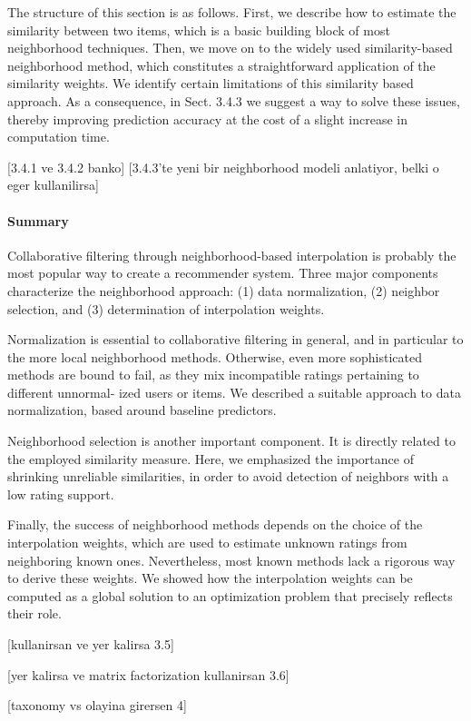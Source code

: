 The structure of this section is as follows. First, we describe how to estimate the similarity between two items, which is a basic building block of most neighborhood techniques. Then, we move on to the widely used similarity-based neighborhood method, which constitutes a straightforward application of the similarity weights. We identify certain limitations of this similarity based approach. As a consequence, in Sect. 3.4.3 we suggest a way to solve these issues, thereby improving prediction accuracy at the cost of a slight increase in computation time.

[3.4.1 ve 3.4.2 banko]
[3.4.3'te yeni bir neighborhood modeli anlatiyor, belki o eger kullanilirsa]

\paragraph{Summary}


Collaborative filtering through neighborhood-based interpolation is probably the most popular way to create a recommender system. Three major components characterize the neighborhood approach: (1) data normalization, (2) neighbor selection, and (3) determination of interpolation weights.

Normalization is essential to collaborative filtering in general, and in particular to the more local neighborhood methods. Otherwise, even more sophisticated methods are bound to fail, as they mix incompatible ratings pertaining to different unnormal- ized users or items. We described a suitable approach to data normalization, based around baseline predictors.

Neighborhood selection is another important component. It is directly related to the employed similarity measure. Here, we emphasized the importance of shrinking unreliable similarities, in order to avoid detection of neighbors with a low rating support.

Finally, the success of neighborhood methods depends on the choice of the interpolation weights, which are used to estimate unknown ratings from neighboring known ones. Nevertheless, most known methods lack a rigorous way to derive these weights. We showed how the interpolation weights can be computed as a global solution to an optimization problem that precisely reflects their role.

[kullanirsan ve yer kalirsa 3.5]

[yer kalirsa ve matrix factorization kullanirsan 3.6]

[taxonomy vs olayina girersen 4]